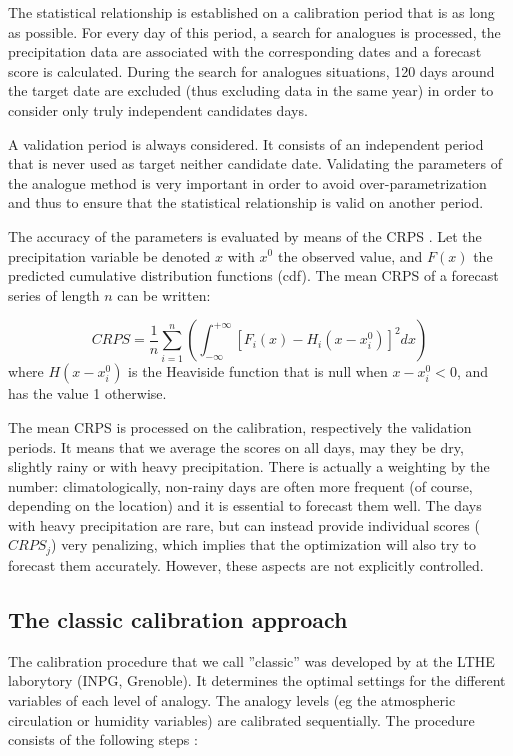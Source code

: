 \documentclass{ametsoc}
\begin{document}
The statistical relationship is established on a calibration period that is as long as possible. For every day of this period, a search for analogues is processed, the precipitation data are associated with the corresponding dates and a forecast score is calculated. During the search for analogues situations, 120 days around the target date are excluded (thus excluding data in the same year) in order to consider only truly independent candidates days.

A validation period is always considered. It consists of an independent period that is never used as target neither candidate date. Validating the parameters of the analogue method is very important in order to avoid over-parametrization and thus to ensure that the statistical relationship is valid on another period.

The accuracy of the parameters is evaluated by means of the CRPS \citep[Continuous Ranked Probability Score,][]{Brown1974, Matheson1976, Hersbach2000}. Let the precipitation variable be denoted $x$ with $x^{0}$ the observed value, and $F(x)$ the predicted cumulative distribution functions (cdf). The mean CRPS of a forecast series of length $n$ can be written:

\begin{equation}
\label{eq:CRPS}
CRPS = \frac{1}{n} \sum_{i=1}^{n} \left(  \int_{-\infty}^{+\infty} \left[ F_{i}(x)-H_{i}(x-x_{i}^{0})\right]^{2} dx \right) 
\end{equation}
where $H(x-x_{i}^{0})$ is the Heaviside function that is null when $x-x_{i}^{0}<0$, and has the value 1 otherwise.

The mean CRPS is processed on the calibration, respectively the validation periods. It means that we average the scores on all days, may they be dry, slightly rainy or with heavy precipitation. There is actually a weighting by the number: climatologically, non-rainy days are often more frequent (of course, depending on the location) and it is essential to forecast them well. The days with heavy precipitation are rare, but can instead provide individual scores ($CRPS_{j}$) very penalizing, which implies that the optimization will also try to forecast them accurately. However, these aspects are not explicitly controlled.


\subsection{The classic calibration approach}

The calibration procedure that we call ''classic'' was developed by \citet{Bontron2004} at the LTHE laborytory (INPG, Grenoble). It determines the optimal settings for the different variables of each level of analogy. The analogy levels (eg the atmospheric circulation or humidity variables) are calibrated sequentially. The procedure consists of the following steps \citet{Bontron2004}:
\end{document}
